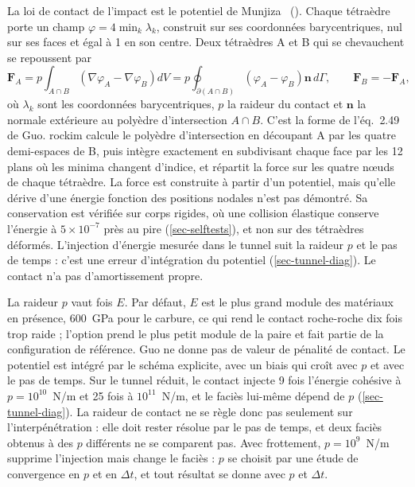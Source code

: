 La loi de contact de l'impact est le potentiel de Munjiza~\cite{munjiza2000penalty} (). Chaque tétraèdre porte un champ $\varphi = 4\min_k \lambda_k$, construit sur ses coordonnées barycentriques, nul sur ses faces et égal à 1 en son centre. Deux tétraèdres A et B qui se chevauchent se repoussent par
\begin{equation}
\mathbf F_A = p \int_{A\cap B} \left(\nabla\varphi_A - \nabla\varphi_B\right) dV
= p \oint_{\partial(A\cap B)} \left(\varphi_A - \varphi_B\right)\mathbf n\, d\Gamma, \qquad \mathbf F_B = -\mathbf F_A,
\label{eq-pot}
\end{equation}
où $\lambda_k$ sont les coordonnées barycentriques, $p$ la raideur du contact et $\mathbf n$ la normale extérieure au polyèdre d'intersection $A\cap B$. C'est la forme de l'éq.~{2.49} de Guo. rockim calcule le polyèdre d'intersection en découpant A par les quatre demi-espaces de B, puis intègre exactement en subdivisant chaque face par les 12 plans où les minima changent d'indice, et répartit la force sur les quatre nœuds de chaque tétraèdre. La force est construite à partir d'un potentiel, mais qu'elle dérive d'une énergie fonction des positions nodales n'est pas démontré. Sa conservation est vérifiée sur corps rigides, où une collision élastique conserve l'énergie à $5\times10^{-7}$ près au pire (\cref{sec-selftests}), et non sur des tétraèdres déformés. L'injection d'énergie mesurée dans le tunnel suit la raideur $p$ et le pas de temps : c'est une erreur d'intégration du potentiel (\cref{sec-tunnel-diag}). Le contact n'a pas d'amortissement propre.

La raideur $p$ vaut  fois $E$. Par défaut, $E$ est le plus grand module des matériaux en présence, 600~GPa pour le carbure, ce qui rend le contact roche-roche dix fois trop raide ; l'option  prend le plus petit module de la paire et fait partie de la configuration de référence. Guo ne donne pas de valeur de pénalité de contact. Le potentiel est intégré par le schéma explicite, avec un biais qui croît avec $p$ et avec le pas de temps. Sur le tunnel réduit, le contact injecte 9 fois l'énergie cohésive à $p = 10^{10}$~N/m et 25 fois à $10^{11}$~N/m, et le faciès lui-même dépend de $p$ (\cref{sec-tunnel-diag}). La raideur de contact ne se règle donc pas seulement sur l'interpénétration : elle doit rester résolue par le pas de temps, et deux faciès obtenus à des $p$ différents ne se comparent pas. Avec frottement, $p = 10^9$~N/m supprime l'injection mais change le faciès : $p$ se choisit par une étude de convergence en $p$ et en $\Delta t$, et tout résultat se donne avec $p$ et $\Delta t$.

